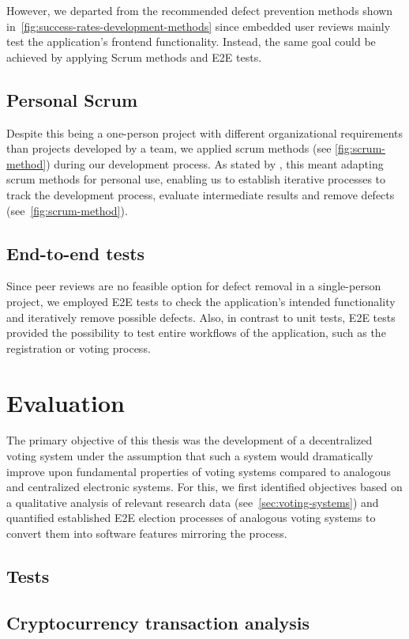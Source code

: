 However, we departed from the recommended defect prevention methods shown in~\cref{fig:success-rates-development-methods} since embedded user reviews mainly test the application’s frontend functionality.
Instead, the same goal could be achieved by applying Scrum methods and \gls{E2E} tests.

\subsection{Personal Scrum}\label{subsec:personal-scrum}

Despite this being a one-person project with different organizational requirements than projects developed by a team, we applied scrum methods (see \cref{fig:scrum-method}) during our development process.
As stated by \textcites{andrews_scrum_2017}{pahuja_scrum_2015}, this meant adapting scrum methods for personal use, enabling us to establish iterative processes to track the development process, evaluate intermediate results and remove defects (see~\cref{fig:scrum-method}).

\subsection{End-to-end tests}\label{subsec:end-to-end-tests}

Since peer reviews are no feasible option for defect removal in a single-person project, we employed E2E tests to check the application’s intended functionality and iteratively remove possible defects.
Also, in contrast to unit tests, \gls{E2E} tests provided the possibility to test entire workflows of the application, such as the registration or voting process.

\section{Evaluation}\label{sec:evaluation}

The primary objective of this thesis was the development of a decentralized voting system under the assumption that such a system would dramatically improve upon fundamental properties of voting systems compared to analogous and centralized electronic systems.
For this, we first identified objectives based on a qualitative analysis of relevant research data (see~\cref{sec:voting-systems}) and quantified established \gls{E2E} election processes of analogous voting systems to convert them into software features mirroring the process.


\subsection{Tests}\label{subsec:tests}
\subsection{Cryptocurrency transaction analysis}\label{subsec:crypto-currency-transaction-analysis}